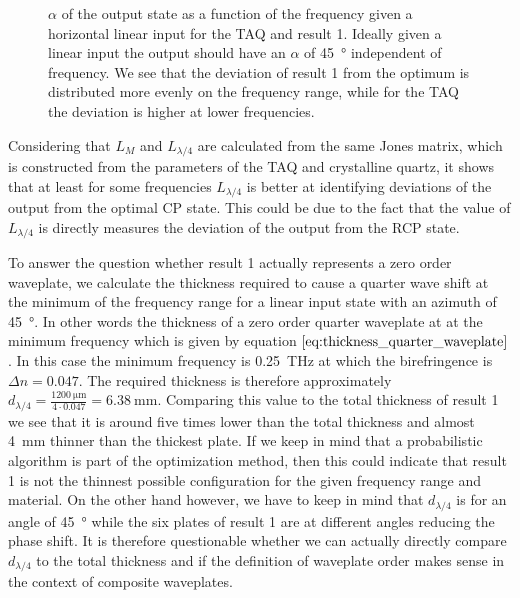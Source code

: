 \begin{figure}[H]
    \centering
    
    \caption{$\alpha$ of the output state as a function of the frequency given a horizontal linear input for the TAQ and result 1. Ideally given a linear input the output should have an $\alpha$ of \SI{45}{\degree} independent of frequency. We see that the deviation of result 1 from the optimum is distributed more evenly on the frequency range, while for the TAQ the deviation is higher at lower frequencies.}
    \label{fig:cl4_alpha}
\end{figure}

Considering that $L_M$ and $L_{\lambda/4}$ are calculated from the same Jones matrix, which is constructed from the parameters of the TAQ and crystalline quartz, it shows that at least for some frequencies $L_{\lambda/4}$ is better at identifying deviations of the output from the optimal CP state. This could be due to the fact that the value of $L_{\lambda/4}$ is directly measures the deviation of the output from the RCP state.

To answer the question whether result 1 actually represents a zero order waveplate, we calculate the thickness required to cause a quarter wave shift at the minimum of the frequency range for a linear input state with an azimuth of \SI{45}{\degree}. In other words the thickness of a zero order quarter waveplate at at the minimum frequency which is given by equation $\ref{eq:thickness_quarter_waveplate}$. In this case the minimum frequency is \SI{0.25}{\tera \hertz} at which the birefringence is $\Delta n = 0.047$. The required thickness is therefore approximately $d_{\lambda/4}=\frac{\SI{1200}{\micro \meter}}{4\cdot0.047}=\SI{6.38}{\milli \meter}$. Comparing this value to the total thickness of result 1 we see that it is around five times lower than the total thickness and almost \SI{4}{\milli \meter} thinner than the thickest plate. If we keep in mind that a probabilistic algorithm is part of the optimization method, then this could indicate that result 1 is not the thinnest possible configuration for the given frequency range and material. On the other hand however, we have to keep in mind that $d_{\lambda/4}$ is for an angle of \SI{45}{\degree} while the six plates of result 1 are at different angles reducing the phase shift. It is therefore questionable whether we can actually directly compare $d_{\lambda/4}$ to the total thickness and if the definition of waveplate order makes sense in the context of composite waveplates. 

